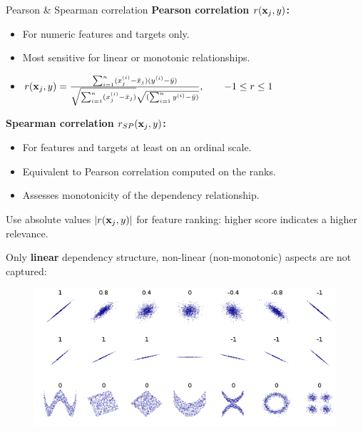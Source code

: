 \documentclass[11pt,compress,t,notes=noshow, xcolor=table]{beamer}
\begin{document}
  \begin{vbframe}{Pearson \& Spearman correlation}
  \textbf{Pearson correlation $r(\mathbf{x}_j, y)$: }
  \begin{itemize}
    \item For numeric features and targets only.
    \item Most sensitive for linear or monotonic relationships.
    \item $ r(\mathbf{x}_j, y) = \frac{\sum_{i=1}^n (x^{(i)}_j - \bar{x}_j) (y^{(i)} - \bar{y})}{\sqrt{\sum_{i=1}^n (x^{(i)}_j - \bar{x}_j)} \sqrt{(\sum_{i=1}^n y^{(i)} - \bar{y})}},\qquad -1 \le r \le 1$
  \end{itemize}
  \textbf{Spearman correlation $r_{SP}(\mathbf{x}_j, y)$:}
  \begin{itemize}
    \item For features and targets at least on an ordinal scale.
    \item Equivalent to Pearson correlation computed on the ranks.
    \item Assesses monotonicity of the dependency relationship.
  \end{itemize}
  \lz
  Use absolute values $|r(\mathbf{x}_j, y)|$ for feature ranking: higher score indicates a higher relevance.

  \framebreak

  Only \textbf{linear} dependency structure, non-linear (non-monotonic) aspects are not captured:

  \lz

  \begin{figure}
    \includegraphics {figure_man/correlation_example.png}
  \end{figure}


\end{vbframe}
\end{document}

